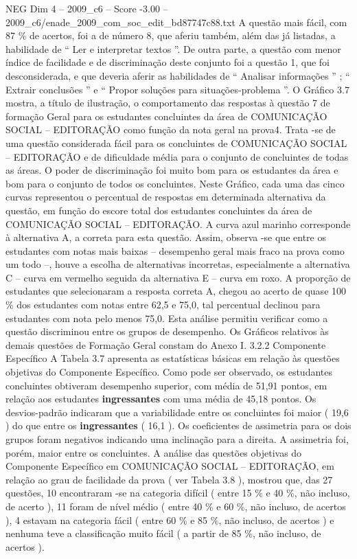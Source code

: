 \begin{textsample}{NEG Dim 4 – 2009\_c6 – Score -3.00 – 2009\_c6/enade\_2009\_com\_soc\_edit\_bd87747c88.txt}
A questão mais fácil, com 87 \% de acertos, foi a de número 8, que aferiu também, além das já listadas, a habilidade de “ Ler e interpretar textos ”.
De outra parte, a questão com menor índice de facilidade e de discriminação deste conjunto foi a questão 1, que foi desconsiderada, e que deveria aferir as habilidades de “ Analisar informações ” ; “ Extrair conclusões ” e “ Propor soluções para situações-problema ”.
O Gráfico 3.7 mostra, a título de ilustração, o comportamento das respostas à questão 7 de formação Geral para os estudantes concluintes da área de COMUNICAÇÃO SOCIAL – EDITORAÇÃO como função da nota geral na prova4.
Trata -se de uma questão considerada fácil para os concluintes de COMUNICAÇÃO SOCIAL – EDITORAÇÃO e de dificuldade média para o conjunto de concluintes de todas as áreas.
O poder de discriminação foi muito bom para os estudantes da área e bom para o conjunto de todos os concluintes.
Neste Gráfico, cada uma das cinco curvas representou o percentual de respostas em determinada alternativa da questão, em função do escore total dos estudantes concluintes da área de COMUNICAÇÃO SOCIAL – EDITORAÇÃO.
A curva azul marinho corresponde à alternativa A, a correta para esta questão.
Assim, observa -se que entre os estudantes com notas mais baixas – desempenho geral mais fraco na prova como um todo –, houve a escolha de alternativas incorretas, especialmente a alternativa C – curva em vermelho seguida da alternativa E – curva em roxo.
A proporção de estudantes que selecionaram a resposta correta A, chegou ao acerto de quase 100 \% dos estudantes com notas entre 62,5 e 75,0, tal percentual declinou para estudantes com nota pelo menos 75,0.
Esta análise permitiu verificar como a questão discriminou entre os grupos de desempenho.
Os Gráficos relativos às demais questões de Formação Geral constam do Anexo I. 3.2.2 Componente Específico A Tabela 3.7 apresenta as estatísticas básicas em relação às questões objetivas do Componente Específico.
Como pode ser observado, os estudantes concluintes obtiveram desempenho superior, com média de 51,91 pontos, em relação aos estudantes \textbf{ingressantes} com uma média de 45,18 pontos.
Os desvios-padrão indicaram que a variabilidade entre os concluintes foi maior ( 19,6 ) do que entre os \textbf{ingressantes} ( 16,1 ).
Os coeficientes de assimetria para os dois grupos foram negativos indicando uma inclinação para a direita.
A assimetria foi, porém, maior entre os concluintes.
A análise das questões objetivas do Componente Específico em COMUNICAÇÃO SOCIAL – EDITORAÇÃO, em relação ao grau de facilidade da prova ( ver Tabela 3.8 ), mostrou que, das 27 questões, 10 encontraram -se na categoria difícil ( entre 15 \% e 40 \%, não incluso, de acerto ), 11 foram de nível médio ( entre 40 \% e 60 \%, não incluso, de acertos ), 4 estavam na categoria fácil ( entre 60 \% e 85 \%, não incluso, de acertos ) e nenhuma teve a classificação muito fácil ( a partir de 85 \%, não incluso, de acertos ).

\end{textsample}
